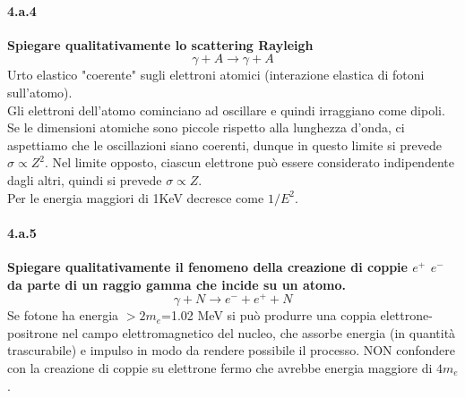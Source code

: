 \documentclass[twoside]{article}
\begin{document}
\paragraph{4.a.4}\textbf{Spiegare qualitativamente lo scattering Rayleigh}\\
\begin{equation}
    \gamma + A \rightarrow \gamma +A 
\end{equation}
Urto elastico "coerente" sugli elettroni atomici (interazione elastica di fotoni sull'atomo).\\
Gli elettroni dell'atomo cominciano ad oscillare e quindi irraggiano come dipoli. Se le dimensioni atomiche sono piccole rispetto alla lunghezza d’onda, ci aspettiamo che le oscillazioni siano coerenti, dunque in questo limite si prevede $\sigma \propto Z^2$. Nel limite opposto, ciascun elettrone può essere considerato indipendente dagli
altri, quindi si prevede $\sigma \propto Z$.\\
Per le energia maggiori di 1KeV decresce come $1/E^2$.

\paragraph{4.a.5}\textbf{Spiegare qualitativamente il fenomeno della creazione di coppie $e^+$ $e^-$ da parte di un raggio gamma che incide su un atomo.}\\
\begin{equation}
    \gamma+N\rightarrow e^- +e^+ +N
\end{equation}
Se fotone ha energia $>2m_e$=1.02 MeV si può produrre una coppia elettrone-positrone nel campo elettromagnetico del nucleo, che assorbe energia (in quantità trascurabile) e impulso in modo da rendere possibile il processo.
\warning NON confondere con la creazione di coppie su elettrone fermo che avrebbe energia maggiore di $4m_e$.
\end{document}
